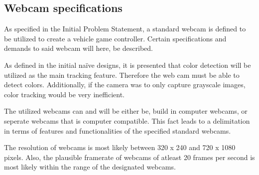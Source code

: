 \subsection{Webcam specifications} \label{webcam}
As specified in the Initial Problem Statement, a standard webcam is defined to be utilized to create a vehicle game controller. Certain specifications and demands to said webcam will here, be described.

As defined in the initial naïve designs, it is presented that color detection will be utilized as the main tracking feature. Therefore the web cam must be able to detect colors. Additionally, if the camera was to only capture grayscale images, color tracking would be very inefficient.  

The utilized webcams can and will be either be, build in computer webcams, or seperate webcams that is computer compatible. This fact leads to a delimitation in terms of features and functionalities of the specified standard webcams.

The resolution of webcams is most likely between 320 x 240 and 720 x 1080 pixels. Also, the plausible framerate of webcams of atleast 20 frames per second is most likely within the range of the designated webcams.

	
